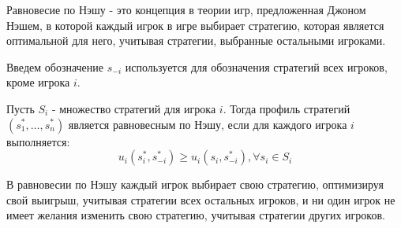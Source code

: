 Равновесие по Нэшу - это концепция в теории игр, предложенная Джоном Нэшем, в которой каждый игрок в игре выбирает стратегию, которая является оптимальной для него, учитывая стратегии, выбранные остальными игроками. \cite{nash1950non}

Введем обозначение $s_{-i}$ используется для обозначения стратегий всех игроков, кроме игрока $i$. 

Пусть \(S_i\) - множество стратегий для игрока \(i\). Тогда профиль стратегий $(s_1^{*}, \dots,s_n^{*})$ является равновесным по Нэшу, если для каждого игрока $i$ выполняется:
$$
    u_i(s_i^{*},s_{-i}^{*}) \ge u_i(s_i,s_{-i}^{*}), \forall s_i \in S_i
$$

В равновесии по Нэшу каждый игрок выбирает свою стратегию, оптимизируя свой выигрыш, учитывая стратегии всех остальных игроков, и ни один игрок не имеет желания изменить свою стратегию, учитывая стратегии других игроков.
